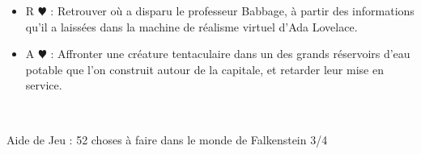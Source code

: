 \documentclass[a5paper,pagesize,french]{book}
\begin{document}
\begin{itemize}
	\item[] R{\color{red} $\varheart$ } : Retrouver où a disparu le professeur Babbage, à partir des informations qu'il a laissées dans la machine de réalisme virtuel d'Ada Lovelace.
	\item[] A{\color{red} $\varheart$ } : Affronter une créature tentaculaire dans un des grands réservoirs d'eau potable que l'on construit autour de la capitale, et retarder leur mise en service.
\end{itemize}~\\

\clearpage

\begin{center}
	{ \LARGE{ \setmainfont{Z003} Aide de Jeu : 52 choses à faire dans le monde de Falkenstein 3/4 } }
\end{center}

\end{document}
